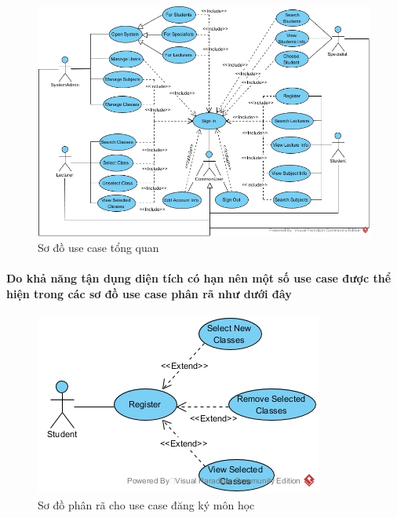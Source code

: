 \documentclass{article}
\begin{document}
  \begin{figure}[!htb]
    \centering
    \includegraphics[scale=0.4]{../pictures/projectdiagrams/uc.jpg}
    \caption{Sơ đồ use case tổng quan}
  \end{figure}

  \paragraph{
    \textnormal{Do khả năng tận dụng diện tích có hạn nên một số use case được thể hiện trong các sơ đồ use case phân rã như dưới đây}
  }
  \clearpage

  \begin{figure}[!htb]
    \centering
    \includegraphics[scale=0.5]{../pictures/projectdiagrams/Register-uc-desctructing.jpg}
    \caption{Sơ đồ phân rã cho use case đăng ký môn học}
  \end{figure}
\end{document}

